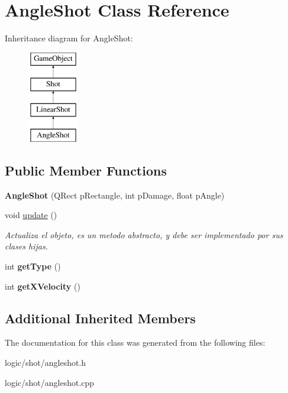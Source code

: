 \hypertarget{class_angle_shot}{\section{Angle\-Shot Class Reference}
\label{class_angle_shot}
}
Inheritance diagram for Angle\-Shot\-:\begin{figure}[H]
\begin{center}
\leavevmode
\includegraphics[height=4.000000cm]{class_angle_shot}
\end{center}
\end{figure}
\subsection*{Public Member Functions}
\begin{DoxyCompactItemize}
\item 
\hypertarget{class_angle_shot_ae25e86a55ee3c18b1c8be4731729059d}{{\bfseries Angle\-Shot} (Q\-Rect p\-Rectangle, int p\-Damage, float p\-Angle)}\label{class_angle_shot_ae25e86a55ee3c18b1c8be4731729059d}

\item 
\hypertarget{class_angle_shot_a15e9f45aedf1a47836b0c603a758dd20}{void \hyperlink{class_angle_shot_a15e9f45aedf1a47836b0c603a758dd20}{update} ()}\label{class_angle_shot_a15e9f45aedf1a47836b0c603a758dd20}

\begin{DoxyCompactList}\small\item\em Actualiza el objeto, es un metodo abstracto, y debe ser implementado por sus clases hijas. \end{DoxyCompactList}\item 
\hypertarget{class_angle_shot_a690154e0ae49ac8667046f0c4a9c1647}{int {\bfseries get\-Type} ()}\label{class_angle_shot_a690154e0ae49ac8667046f0c4a9c1647}

\item 
\hypertarget{class_angle_shot_a7e51f41031536ff1086055eab24d544d}{int {\bfseries get\-X\-Velocity} ()}\label{class_angle_shot_a7e51f41031536ff1086055eab24d544d}

\end{DoxyCompactItemize}
\subsection*{Additional Inherited Members}


The documentation for this class was generated from the following files\-:\begin{DoxyCompactItemize}
\item 
logic/shot/angleshot.\-h\item 
logic/shot/angleshot.\-cpp\end{DoxyCompactItemize}
